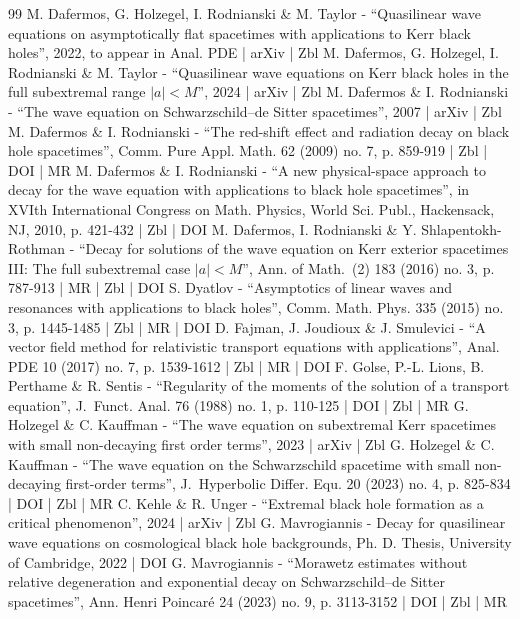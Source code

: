\documentclass[10pt]{amsart}
\theoremstyle{plain}
\theoremstyle{definition}
\begin{document}
\begin{thebibliography}{99}
M. Dafermos, G. Holzegel, I. Rodnianski \& M. Taylor - “Quasilinear wave equations on asymptotically flat spacetimes with applications to Kerr black holes”, 2022, to appear in Anal. PDE | arXiv | Zbl
M. Dafermos, G. Holzegel, I. Rodnianski \& M. Taylor - “Quasilinear wave equations on Kerr black holes in the full subextremal range $|a|<{M}$”, 2024 | arXiv | Zbl
M. Dafermos \& I. Rodnianski - “The wave equation on Schwarzschild–de Sitter spacetimes”, 2007 | arXiv | Zbl
M. Dafermos \& I. Rodnianski - “The red-shift effect and radiation decay on black hole spacetimes”, Comm. Pure Appl. Math. 62 (2009) no. 7, p. 859-919 | Zbl | DOI | MR
M. Dafermos \& I. Rodnianski - “A new physical-space approach to decay for the wave equation with applications to black hole spacetimes”, in XVIth International Congress on Math. Physics, World Sci. Publ., Hackensack, NJ, 2010, p. 421-432 | Zbl | DOI
M. Dafermos, I. Rodnianski \& Y. Shlapentokh-Rothman - “Decay for solutions of the wave equation on Kerr exterior spacetimes III: The full subextremal case $|a|<M$”, Ann. of Math. (2) 183 (2016) no. 3, p. 787-913 | MR | Zbl | DOI
S. Dyatlov - “Asymptotics of linear waves and resonances with applications to black holes”, Comm. Math. Phys. 335 (2015) no. 3, p. 1445-1485 | Zbl | MR | DOI
D. Fajman, J. Joudioux \& J. Smulevici - “A vector field method for relativistic transport equations with applications”, Anal. PDE 10 (2017) no. 7, p. 1539-1612 | Zbl | MR | DOI
F. Golse, P.-L. Lions, B. Perthame \& R. Sentis - “Regularity of the moments of the solution of a transport equation”, J. Funct. Anal. 76 (1988) no. 1, p. 110-125 | DOI | Zbl | MR
G. Holzegel \& C. Kauffman - “The wave equation on subextremal Kerr spacetimes with small non-decaying first order terms”, 2023 | arXiv | Zbl
G. Holzegel \& C. Kauffman - “The wave equation on the Schwarzschild spacetime with small non-decaying first-order terms”, J. Hyperbolic Differ. Equ. 20 (2023) no. 4, p. 825-834 | DOI | Zbl | MR
C. Kehle \& R. Unger - “Extremal black hole formation as a critical phenomenon”, 2024 | arXiv | Zbl
G. Mavrogiannis - Decay for quasilinear wave equations on cosmological black hole backgrounds, Ph. D. Thesis, University of Cambridge, 2022 | DOI
G. Mavrogiannis - “Morawetz estimates without relative degeneration and exponential decay on Schwarzschild–de Sitter spacetimes”, Ann. Henri Poincaré 24 (2023) no. 9, p. 3113-3152 | DOI | Zbl | MR

\end{thebibliography}
\end{document}
